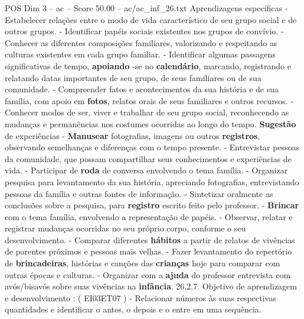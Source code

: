 \begin{textsample}{POS Dim 3 – ac – Score 50.00 – ac/ac\_inf\_26.txt}
Aprendizagens específicas - Estabelecer relações entre o modo de vida característico de seu grupo social e de outros grupos. - Identificar papéis sociais existentes nos grupos de convívio. - Conhecer as diferentes composições familiares, valorizando e respeitando as culturas existentes em cada grupo familiar. - Identificar algumas passagens significativas de tempo, \textbf{apoiando} -se no \textbf{calendário}, marcando, registrando e relatando datas importantes de seu grupo, de seus familiares ou de sua comunidade. - Compreender fatos e acontecimentos da sua história e de sua família, com apoio em \textbf{fotos}, relatos orais de seus familiares e outros recursos. - Conhecer modos de ser, viver e trabalhar de seu grupo social, reconhecendo as mudanças e permanências nos costumes ocorridas ao longo do tempo. \textbf{Sugestão} de experiências - \textbf{Manusear} fotografias, imagens ou outros \textbf{registros}, observando semelhanças e diferenças com o tempo presente. - Entrevistar pessoas da comunidade, que possam compartilhar seus conhecimentos e experiências de vida. - Participar de \textbf{roda} de conversa envolvendo o tema família. - Organizar pesquisa para levantamento da sua história, apreciando fotografias, entrevistando pessoas da família e outras fontes de informação. - Sintetizar oralmente as conclusões sobre a pesquisa, para \textbf{registro} escrito feito pelo professor. - \textbf{Brincar} com o tema família, envolvendo a representação de papéis. - Observar, relatar e registrar mudanças ocorridas no seu próprio corpo, conforme o seu desenvolvimento. - Comparar diferentes \textbf{hábitos} a partir de relatos de vivências de parentes próximos e pessoas mais velhas. - Fazer levantamento do repertório de \textbf{brincadeiras}, histórias e canções das \textbf{crianças} hoje para comparar com outras épocas e culturas. - Organizar com a \textbf{ajuda} do professor entrevista com avós/bisavós sobre suas vivências na \textbf{infância}. 26.2.7.
Objetivo de aprendizagem e desenvolvimento : ( EI03ET07 ) - Relacionar números às suas respectivas quantidades e identificar o antes, o depois e o entre em uma sequência.

\end{textsample}
